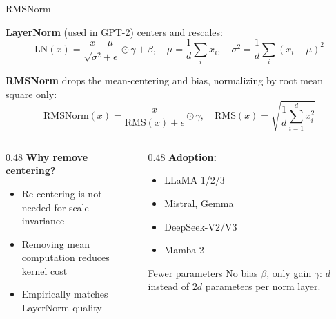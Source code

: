 \begin{frame}{RMSNorm~\cite{zhang2019rmsnorm}}

  \textbf{LayerNorm} (used in GPT-2) centers and rescales:
  \[
    \text{LN}(x) = \frac{x - \mu}{\sqrt{\sigma^2 + \epsilon}} \odot \gamma + \beta,
    \quad \mu = \frac{1}{d}\sum_i x_i,
    \quad \sigma^2 = \frac{1}{d}\sum_i (x_i - \mu)^2
  \]

  \textbf{RMSNorm} drops the mean-centering and bias, normalizing by root mean square only:
  \[
    \text{RMSNorm}(x) = \frac{x}{\text{RMS}(x) + \epsilon} \odot \gamma,
    \quad \text{RMS}(x) = \sqrt{\frac{1}{d}\sum_{i=1}^{d} x_i^2}
  \]

  \vspace{0.3em}
  \begin{columns}[T]
    \begin{column}{0.48\textwidth}
      \textbf{Why remove centering?}
      \begin{itemize}
        \item Re-centering is not needed for scale invariance
        \item Removing mean computation reduces kernel cost
        \item Empirically matches LayerNorm quality
      \end{itemize}
    \end{column}
    \begin{column}{0.48\textwidth}
      \textbf{Adoption:}
      \begin{itemize}
        \item LLaMA 1/2/3
        \item Mistral, Gemma
        \item DeepSeek-V2/V3
        \item Mamba 2
      \end{itemize}

      \vspace{0.3em}
      \begin{block}{Fewer parameters}
        No bias $\beta$, only gain $\gamma$: $d$ instead of $2d$ parameters per norm layer.
      \end{block}
    \end{column}
  \end{columns}
\end{frame}

